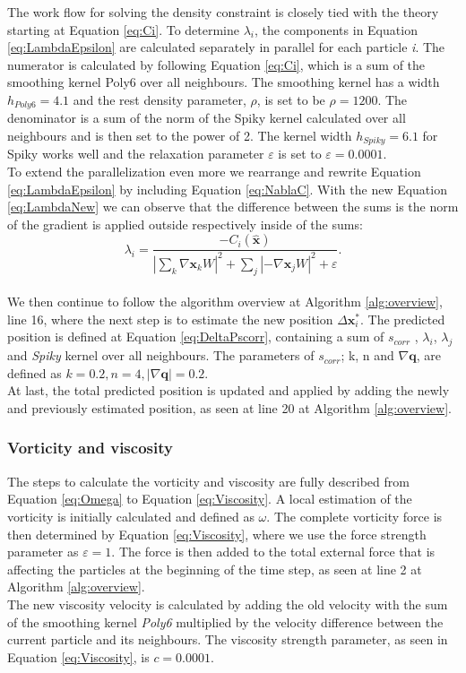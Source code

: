 The work flow for solving the density constraint is closely tied with the theory starting at Equation \ref{eq:Ci}.
To determine $\lambda_{i}$, the components in Equation \ref{eq:LambdaEpsilon} are calculated separately in parallel
for each particle \textit{i}.
The numerator is calculated by following Equation \ref{eq:Ci}, which is a sum of the smoothing kernel Poly6 over
all neighbours. The smoothing kernel has a width $h_{Poly6} = 4.1$ and the rest density parameter, $\rho$, is set to be $\rho = 1200$.
The denominator is a sum of the norm of the Spiky kernel calculated over all neighbours
and is then set to the power of 2. The kernel width $h_{Spiky} = 6.1$ for Spiky works well and the
relaxation parameter $\varepsilon$ is set to $\varepsilon = 0.0001$.
\\
\newline
To extend the parallelization even more we rearrange and rewrite Equation \ref{eq:LambdaEpsilon} by including Equation \ref{eq:NablaC}. With the
new Equation \ref{eq:LambdaNew} we can observe that the difference between the sums is the norm of the gradient is applied
outside respectively inside of the sums:
\\
\begin{equation}
\label{eq:LambdaNew}
\lambda_i = \frac{- C_i(\hat{\mathbf{x}}) }{ |\sum\limits_{k} \nabla \mathbf{x}_k W|^{2} + \sum\limits_{j} |-\nabla \mathbf{x}_j W|^2  + \varepsilon}.
\end{equation}
\\
\newline
We then continue to follow the algorithm overview at Algorithm \ref{alg:overview}, line 16, where the next step is to estimate the new position $\Delta \mathbf{x}^{*}_{i}$.
The predicted position is defined at Equation \ref{eq:DeltaPscorr}, containing a sum of $s_{corr}$ , $\lambda_{i}$, $\lambda_{j}$
and \textit{Spiky} kernel over all neighbours.
The parameters of $s_{corr}$; k, n and $ \nabla \mathbf{q}$, are defined as $k = 0.2, n = 4, |\nabla \mathbf{q}| = 0.2$.
\\
At last, the total predicted position is updated and applied by adding the newly and previously estimated position,
as seen at line 20 at Algorithm \ref{alg:overview}.

\subsubsection{Vorticity and viscosity}
The steps to calculate the vorticity and viscosity are fully described from Equation \ref{eq:Omega} to Equation \ref{eq:Viscosity}.
A local estimation of the vorticity is initially calculated and defined as $\omega$. The complete vorticity force is then determined
by Equation \ref{eq:Viscosity}, where we use the force strength parameter as $\varepsilon = 1$. The force is then added to the total
external force that is affecting the particles at the beginning of the time step, as seen at line 2 at Algorithm \ref{alg:overview}.
\\
The new viscosity velocity is calculated by adding the old velocity with the sum of the smoothing kernel \textit{Poly6} multiplied by the velocity difference between
the current particle and its neighbours. The viscosity strength parameter, as seen in Equation \ref{eq:Viscosity}, is $c = 0.0001$.
